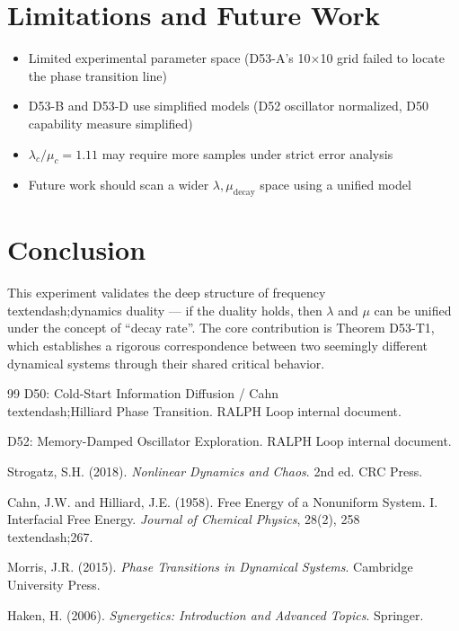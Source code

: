 \documentclass[12pt, a4paper]{article}
\begin{document}
\section{Limitations and Future Work}

\begin{itemize}
    \item Limited experimental parameter space (D53-A's 10$\times$10 grid failed to locate the phase transition line)
    \item D53-B and D53-D use simplified models (D52 oscillator normalized, D50 capability measure simplified)
    \item $\lambda_c / \mu_c = 1.11$ may require more samples under strict error analysis
    \item Future work should scan a wider $\lambda, \mu_{\text{decay}}$ space using a unified model
\end{itemize}

\section{Conclusion}

This experiment validates the deep structure of frequency\\textendash;dynamics duality --- if the duality holds, then $\lambda$ and $\mu$ can be unified under the concept of ``decay rate''. The core contribution is Theorem D53-T1, which establishes a rigorous correspondence between two seemingly different dynamical systems through their shared critical behavior.


\begin{thebibliography}{99}
 D50: Cold-Start Information Diffusion / Cahn\\textendash;Hilliard Phase Transition. RALPH Loop internal document.

 D52: Memory-Damped Oscillator Exploration. RALPH Loop internal document.

 Strogatz, S.H. (2018). \emph{Nonlinear Dynamics and Chaos}. 2nd ed. CRC Press.

 Cahn, J.W. and Hilliard, J.E. (1958). Free Energy of a Nonuniform System. I. Interfacial Free Energy. \emph{Journal of Chemical Physics}, 28(2), 258\\textendash;267.

 Morris, J.R. (2015). \emph{Phase Transitions in Dynamical Systems}. Cambridge University Press.

 Haken, H. (2006). \emph{Synergetics: Introduction and Advanced Topics}. Springer.
\end{thebibliography}
\end{document}
